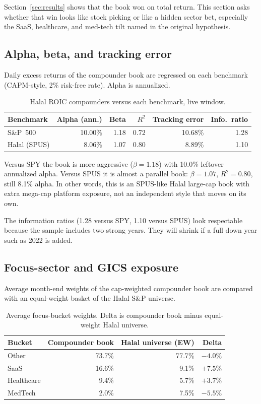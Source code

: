 \documentclass[11pt,letterpaper]{article}
\begin{document}
Section~\ref{sec:results} shows that the book won on total return. This section asks whether that win looks like stock picking or like a hidden sector bet, especially the SaaS, healthcare, and med-tech tilt named in the original hypothesis.

\subsection{Alpha, beta, and tracking error}

Daily excess returns of the compounder book are regressed on each benchmark (CAPM-style, 2\% risk-free rate). Alpha is annualized.

\begin{table}[htbp]
\centering
\caption{Halal ROIC compounders versus each benchmark, live window.}
\label{tab:capm}
\begin{tabular}{lrrrrr}
\toprule
Benchmark & Alpha (ann.) & Beta & $R^2$ & Tracking error & Info.\ ratio \\
\midrule
S\&P~500     & 10.00\% & 1.18 & 0.72 & 10.68\% & 1.28 \\
Halal (SPUS) & 8.06\%  & 1.07 & 0.80 & 8.89\%  & 1.10 \\
\bottomrule
\end{tabular}
\end{table}

Versus SPY the book is more aggressive ($\beta = 1.18$) with 10.0\% leftover annualized alpha. Versus SPUS it is almost a parallel book: $\beta = 1.07$, $R^2 = 0.80$, still 8.1\% alpha. In other words, this is an SPUS-like Halal large-cap book with extra mega-cap platform exposure, not an independent style that moves on its own.

The information ratios (1.28 versus SPY, 1.10 versus SPUS) look respectable because the sample includes two strong years. They will shrink if a full down year such as 2022 is added.

\subsection{Focus-sector and GICS exposure}

Average month-end weights of the cap-weighted compounder book are compared with an equal-weight basket of the Halal S\&P universe.

\begin{table}[htbp]
\centering
\caption{Average focus-bucket weights. Delta is compounder book minus equal-weight Halal universe.}
\label{tab:focus}
\small
\begin{tabular}{lrrr}
\toprule
Bucket & Compounder book & Halal universe (EW) & Delta \\
\midrule
Other                      & 73.7\% & 77.7\% & $-4.0\%$ \\
SaaS                       & 16.6\% & 9.1\%  & $+7.5\%$ \\
Healthcare                 & 9.4\%  & 5.7\%  & $+3.7\%$ \\
MedTech                    & 2.0\%  & 7.5\%  & $-5.5\%$ \\
\bottomrule
\end{tabular}
\end{table}
\end{document}
